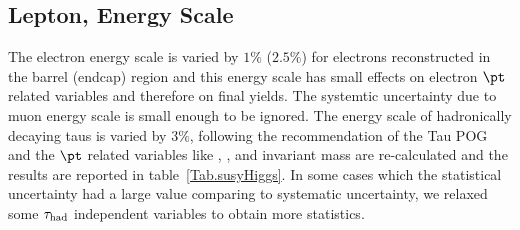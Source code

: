 \subsection{\texorpdfstring{Lepton, \hadtau Energy Scale}{Tau Energy Scale}}

The electron energy scale is varied by $1\%$ ($2.5\%$) for electrons reconstructed in the barrel (endcap) region and this energy scale has small effects on electron $\pt$ related variables and therefore on final yields. The systemtic uncertainty due to muon energy scale is small enough to be ignored. The energy scale of hadronically decaying taus is varied by $3\%$, following the recommendation of the Tau POG~\cite{TauPOG} and the \hadtau $\pt$ related variables like \MET, \mttwo, \mindphifour and invariant mass are re-calculated and the results are reported in table~\ref{Tab.susyHiggs}. In some cases which the statistical uncertainty had a large value comparing to systematic uncertainty, we relaxed some $\tau_{\rm had}$ \pt  independent variables to obtain more statistics.








